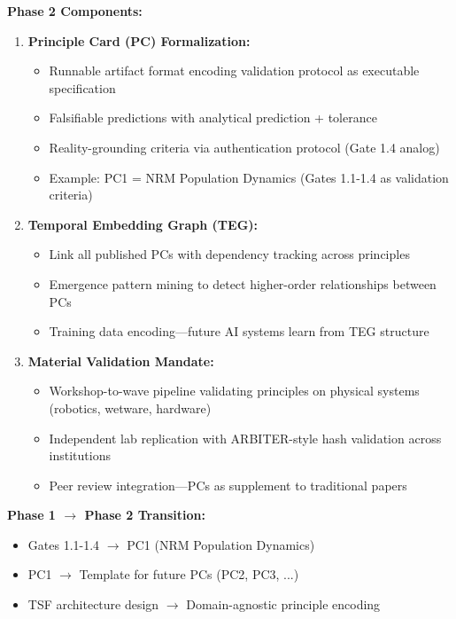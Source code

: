 \documentclass[11pt]{article}
\begin{document}
\textbf{Phase 2 Components:}

\begin{enumerate}
\item \textbf{Principle Card (PC) Formalization:}
\begin{itemize}
\item Runnable artifact format encoding validation protocol as executable specification
\item Falsifiable predictions with analytical prediction + tolerance
\item Reality-grounding criteria via authentication protocol (Gate 1.4 analog)
\item Example: PC1 = NRM Population Dynamics (Gates 1.1-1.4 as validation criteria)
\end{itemize}

\item \textbf{Temporal Embedding Graph (TEG):}
\begin{itemize}
\item Link all published PCs with dependency tracking across principles
\item Emergence pattern mining to detect higher-order relationships between PCs
\item Training data encoding—future AI systems learn from TEG structure
\end{itemize}

\item \textbf{Material Validation Mandate:}
\begin{itemize}
\item Workshop-to-wave pipeline validating principles on physical systems (robotics, wetware, hardware)
\item Independent lab replication with ARBITER-style hash validation across institutions
\item Peer review integration—PCs as supplement to traditional papers
\end{itemize}
\end{enumerate}

\textbf{Phase 1 $\rightarrow$ Phase 2 Transition:}
\begin{itemize}
\item Gates 1.1-1.4 $\rightarrow$ PC1 (NRM Population Dynamics)
\item PC1 $\rightarrow$ Template for future PCs (PC2, PC3, ...)
\item TSF architecture design $\rightarrow$ Domain-agnostic principle encoding
\end{itemize}
\end{document}
